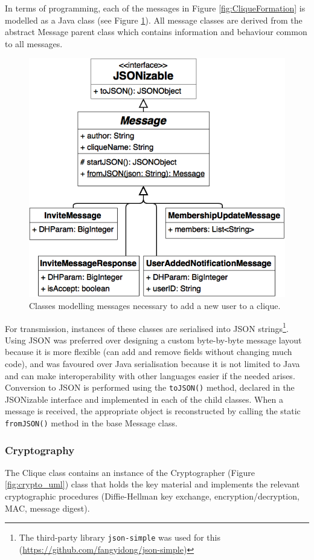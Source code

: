 \documentclass[a4paper, twoside, 12pt]{report}
\begin{document}
In terms of programming, each of the messages in Figure \ref{fig:CliqueFormation} is modelled as a Java class (see Figure \ref{fig:messages_uml}). All message classes are derived from the abstract Message parent class which contains information and behaviour common to all messages.

\begin{figure}[H]
    \centering
    \includegraphics[width=0.6\linewidth]{pics/messages_uml.png}
    \caption{\label{fig:messages_uml} Classes modelling messages necessary to add a new user to a clique.}
\end{figure}

For transmission, instances of these classes are serialised into JSON strings\footnote{The third-party library \texttt{json-simple} was used for this (\url{https://github.com/fangyidong/json-simple})}. Using JSON was preferred over designing a custom byte-by-byte message layout because it is more flexible (can add and remove fields without changing much code), and was favoured over Java serialisation because it is not limited to Java and can make interoperability with other languages easier if the needed arises. Conversion to JSON is performed using the \texttt{toJSON()} method, declared in the JSONizable interface and implemented in each of the child classes. When a message is received, the appropriate object is reconstructed by calling the static \texttt{fromJSON()} method in the base Message class. \\

\subsubsection{Cryptography}
The Clique class contains an instance of the Cryptographer (Figure \ref{fig:crypto_uml}) class that holds the key material and implements the relevant cryptographic procedures (Diffie-Hellman key exchange, encryption/decryption, MAC, message digest).
\end{document}
